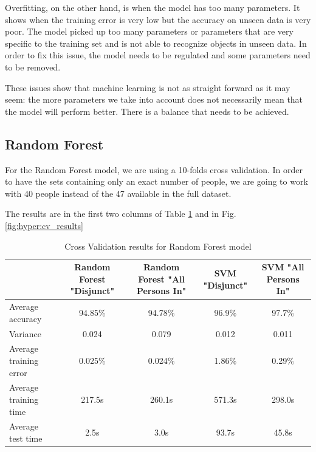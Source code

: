\documentclass[conference]{IEEEtran}
\begin{document}
\textcolor{baptiste}{Overfitting, on the other hand, is when the model has too many parameters. It shows when the training error is very low but the accuracy on unseen data is very poor. The model picked up too many parameters or parameters that are very specific to the training set and is not able to recognize objects in unseen data. In order to fix this issue, the model needs to be regulated and some parameters need to be removed.}

\textcolor{baptiste}{These issues show that machine learning is not as straight forward as it may seem: the more parameters we take into account does not necessarily mean that the model will perform better. There is a balance that needs to be achieved.
}




\subsection{Random Forest}

\textcolor{baptiste}{For the Random Forest model, we are using a 10-folds cross validation. In order to have the sets containing only an exact number of people, we are going to work with 40 people instead of the 47 available in the full dataset.}

\textcolor{baptiste}{The results are in the first two columns of Table \ref{table:CV_RF_results} and in Fig. \ref{fig:hyper:cv_results}}

\begin{table}[htbp]
    \color{baptiste}
    \caption{\color{baptiste}Cross Validation results for Random Forest model}
    \begin{center}
    \begin{tabular}{|l|c|c|c|c|}
        \hline
        \textbf{} & \textbf{Random Forest "Disjunct"} & \textbf{Random Forest "All Persons In"} & \textbf{SVM "Disjunct"} & \textbf{SVM "All Persons In"}\\
        \hline
        Average accuracy & 94.85\% & 94.78\% & 96.9\% & 97.7\% \\
        \hline
        Variance & 0.024 & 0.079 & 0.012 & 0.011 \\
        \hline
        Average training error & 0.025\% & 0.024\% & 1.86\% & 0.29\% \\
        \hline
        Average training time & 217.5s & 260.1s & 571.3s & 298.0s \\
        \hline
        Average test time & 2.5s & 3.0s & 93.7s & 45.8s \\
        \hline
    \end{tabular}
    \label{table:CV_RF_results}
    \end{center}
\end{table}
\end{document}
